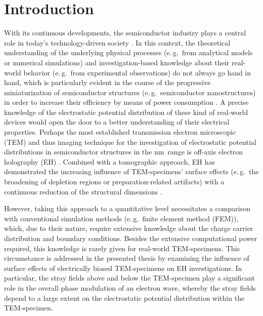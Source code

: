 \chapter{Introduction} \label{chap:introduction}
With its continuous developments, the semiconductor industry plays a central role in today's technology-driven society \cite{More1965,Bank1990,Smith1997,Alferov1998,Flamm2003,Wachutka2004,Jenkins2005,Lukasiak2010,Mack2011,Klein2016,Leiserson2020}. In this context, the theoretical understanding of the underlying physical processes (e.\,g.\ from analytical models or numerical simulations) and investigation-based knowledge about their real-world behavior (e.\,g.\ from experimental observations) do not always go hand in hand, which is particularly evident in the course of the progressive miniaturization of semiconductor structures (e.\,g.\ semiconductor nanostructures) in order to increase their efficiency by means of power consumption \cite{Twitchett2002,Beleggia2003,Cooper2006,Cooper2007,Twitchett-Harrison2007,Cooper2009,Somodi2013,Yazdi2015}. A precise knowledge of the electrostatic potential distribution of these kind of real-world devices would open the door to a better understanding of their electrical properties. Perhaps the most established transmission electron microscopic (TEM) and thus imaging technique for the investigation of electrostatic potential distributions in semiconductor structures in the $\si{\nm}$~range is off-axis electron holography (EH) \cite{Lichte1986,Tonomura1987,Cowley1992,DuninBorkowski2004}. Combined with a tomographic approach, EH has demonstrated the increasing influence of TEM-specimens' surface effects (e.\,g.\ the broadening of depletion regions or preparation-related artifacts) with a continuous reduction of the structural dimensions \cite{Twitchett-Harrison2007,Miao2016}.

However, taking this approach to a quantitative level necessitates a comparison with conventional simulation methods (e.\,g.\ finite element method (FEM)), which, due to their nature, require extensive knowledge about the charge carrier distribution and boundary conditions. Besides the extensive computational power required, this knowledge is rarely given for real-world TEM-specimens. This circumstance is addressed in the presented thesis by examining the influence of surface effects of electrically biased TEM-specimens on EH investigations. In particular, the stray fields above and below the TEM-specimen play a significant role in the overall phase modulation of an electron wave, whereby the stray fields depend to a large extent on the electrostatic potential distribution within the TEM-specimen.

